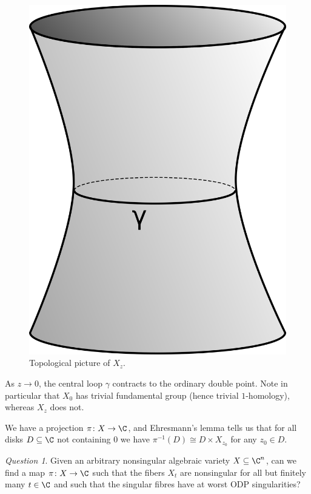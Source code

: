\documentclass[A4paper, british]{amsart}
\theoremstyle{darkgreentheorem}
\theoremstyle{darkbluedefinition}
\theoremstyle{darkredexample}
\theoremstyle{remark}
\newtheorem{q}[thm]{Question}
\newcommand{\1}{\mathbbm{1}}
\begin{document}
\begin{figure}[h]
    \centering
    \includegraphics[scale=.8]{smoothfiber}
    \caption{Topological picture of $X_{z}$.}
    \label{fig:smoothfibre}
\end{figure}

As $z\to 0$, the central loop $\gamma$ contracts to the ordinary double point.
Note in particular that $X_{0}$ has trivial fundamental group (hence trivial $1$-homology), whereas $X_{z}$ does not.

We have a projection $\pi\colon X\to \C$, and Ehresmann's lemma tells us that for all disks $D\subseteq \C$ not containing $0$ we have $\pi^{-1}(D)\cong D\times X_{z_{0}}$ for any $z_{0}\in D$.

\begin{q}
    Given an arbitrary nonsingular algebraic variety $X\subseteq \C^{n}$, can we find a map $\pi\colon X\to \C$ such that the fibers $X_{t}$ are nonsingular for all but finitely many $t\in \C$ and such that the singular fibres have at worst ODP singularities?
\end{q}
\end{document}
